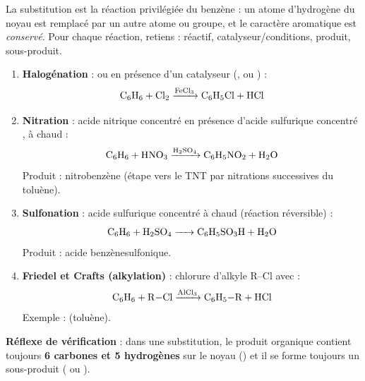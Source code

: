 \documentclass[11pt]{article}
\newcommand{\cle}[1]{{\popxbold\color{popdark}#1}}
\begin{document}
\begin{methode}
La substitution est la réaction privilégiée du benzène : un atome d'hydrogène du noyau est \cle{remplacé} par un autre atome ou groupe, et le caractère aromatique est \emph{conservé}. Pour chaque réaction, retiens : réactif, catalyseur/conditions, produit, sous-produit.
\begin{enumerate}
\item \textbf{Halogénation} :  ou  en présence d'un catalyseur (,  ou ) :
\[ \ce{C6H6 + Cl2 ->[FeCl3] C6H5Cl + HCl} \]
\item \textbf{Nitration} : acide nitrique concentré  en présence d'acide sulfurique concentré , à chaud :
\[ \ce{C6H6 + HNO3 ->[H2SO4] C6H5NO2 + H2O} \]
Produit : nitrobenzène (étape vers le TNT par nitrations successives du toluène).
\item \textbf{Sulfonation} : acide sulfurique concentré à chaud (réaction réversible) :
\[ \ce{C6H6 + H2SO4 -> C6H5SO3H + H2O} \]
Produit : acide benzènesulfonique.
\item \textbf{Friedel et Crafts (alkylation)} : chlorure d'alkyle R--Cl avec  :
\[ \ce{C6H6 + R-Cl ->[AlCl3] C6H5-R + HCl} \]
Exemple :  (toluène).
\end{enumerate}
\textbf{Réflexe de vérification} : dans une substitution, le produit organique contient toujours \textbf{6 carbones et 5 hydrogènes} sur le noyau () et il se forme toujours un sous-produit ( ou ).
\end{methode}
\end{document}
